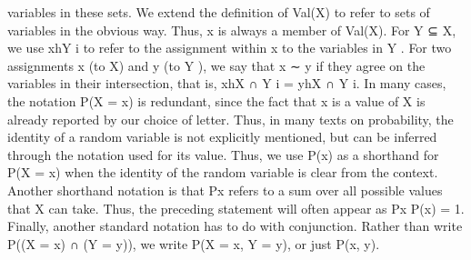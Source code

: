 variables in these sets. We extend the definition of Val(X) to refer to sets of variables in the obvious way. Thus, x is always a member of Val(X). For Y ⊆ X, we use xhY i to refer to the assignment within x to the variables in Y . For two assignments x (to X) and y (to Y ), we say that x ∼ y if they agree on the variables in their intersection, that is, xhX ∩ Y i = yhX ∩ Y i. In many cases, the notation P(X = x) is redundant, since the fact that x is a value of X is already reported by our choice of letter. Thus, in many texts on probability, the identity of a random variable is not explicitly mentioned, but can be inferred through the notation used for its value. Thus, we use P(x) as a shorthand for P(X = x) when the identity of the random variable is clear from the context. Another shorthand notation is that Px refers to a sum over all possible values that X can take. Thus, the preceding statement will often appear as Px P(x) = 1. Finally, another standard notation has to do with conjunction. Rather than write P((X = x) ∩ (Y = y)), we write P(X = x, Y = y), or just P(x, y).

